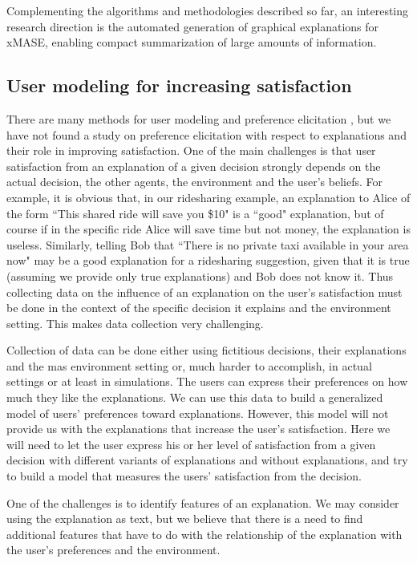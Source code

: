 \documentclass[letterpaper]{article} %
\begin{document}
{{{{{{{{{Complementing  the algorithms and methodologies described so far, an interesting research direction is the automated generation of graphical explanations for xMASE, enabling compact summarization of large amounts of information.
\subsection{User modeling for increasing satisfaction}
There are many methods for user modeling and preference elicitation \cite{rosenfeld2018predicting,anselmi2018comparison}, but we have not found a study on preference elicitation with respect to explanations and their role in improving satisfaction. One of the main challenges is that user  satisfaction from an explanation of a given decision strongly depends on the actual decision, the other agents, the environment and the user's beliefs. For example, it is obvious that, in our ridesharing example, an explanation to Alice of the form ``This shared ride will save you \$10" is a ``good" explanation, but of course if in the specific ride Alice will save time but not money, the explanation is useless. Similarly, telling Bob that ``There is no private taxi available in your area now" may be a good explanation for a ridesharing suggestion, given that it is true (assuming we provide only true explanations) and Bob does not know it. Thus collecting data on the influence of an explanation on the user's satisfaction must be done in the context of the specific decision it explains and the environment setting. This makes data collection very challenging.

Collection of data can be done either using fictitious decisions, their explanations and the \ac{mas} environment setting or, much harder to accomplish, in actual settings or at least in simulations.
The users can express their preferences on how much they like the explanations. We can use this data to build a generalized model of users' preferences toward explanations. However, this model will not provide us with the explanations that increase the user's satisfaction. Here we will need to let the user express his or her level of  satisfaction from a given decision with different variants of explanations and without explanations, and try to build a model that measures the users' satisfaction from the decision.

One of the challenges is to identify features of an explanation. We may consider using the explanation as text, but we believe that there is a need to find additional features that have to do with the relationship of the explanation with the user's preferences and the environment.

}}}}}}}}}
\end{document}
